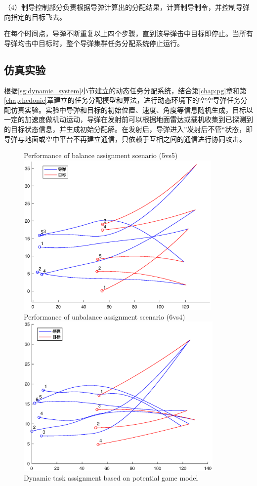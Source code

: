 （4）制导控制部分负责根据导弹计算出的分配结果，计算制导制令，并控制导弹向指定的目标飞去。

在每个时间点，导弹不断重复以上四个步骤，直到该导弹击中目标即停止。当所有导弹均击中目标时，整个导弹集群任务分配系统停止运行。

\subsection{仿真实验}
\label{sg:simulation}

根据\ref{sg:dynamic_system}小节建立的动态任务分配系统，结合第\ref{chap:pg}章和第\ref{chap:hedonic}章建立的任务分配模型和算法，进行动态环境下的空空导弹任务分配仿真实验。实验中导弹和目标的初始位置、速度、角度等信息随机生成，目标以一定的加速度做机动运动，导弹在发射前可以根据地面雷达或载机收集到已探测到的目标状态信息，并生成初始分配解。在发射后，导弹进入”发射后不管“状态，即导弹与地面或空中平台不再建立通信，只依赖于互相之间的通信进行协同攻击。

\begin{figure}[!hbtp]
  \centering
                  {Performance of balance assignment scenario (5vs5)}%
                  {\includegraphics[height=8cm]{stochastic_game/SAP5vs5}}
                  {Performance of unbalance assignment scenario (6vs4)}%
                  {\includegraphics[height=8cm]{stochastic_game/SAP6vs4}}
            {Dynamic task assignment based on potential game model}
  \label{sg:fig:pg}
\end{figure}

